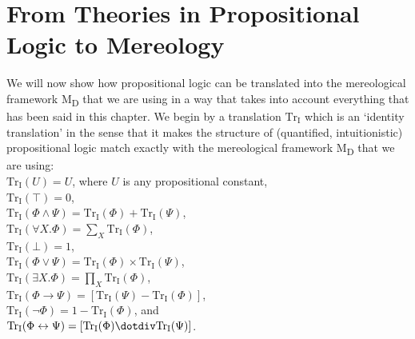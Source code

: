 \documentclass[12pt]{book}
\begin{document}
\section{From Theories in Propositional Logic to Mereology} \label{translation_from_propositional_logic}
We will now show how propositional logic can be translated into the mereological framework M\textsubscript{D} that we are using in a way that takes into account everything that has been said in this chapter. We begin by a translation $\mathrm{Tr_I}$ which is an `identity translation' in the sense that it makes the structure of (quantified, intuitionistic) propositional logic match exactly with the mereological framework M\textsubscript{D} that we are using:\\
\indent $\mathrm{Tr_I}(U) = U$, where $U$ is any propositional constant,\\
\indent $\mathrm{Tr_I}(\top) = 0$,\\
\indent $\mathrm{Tr_I}(\Phi \wedge \Psi) = \mathrm{Tr_I}(\Phi) + \mathrm{Tr_I}(\Psi)$,\\
\indent $\mathrm{Tr_I}(\forall X.\Phi) = \sum_{X}^{}{\mathrm{Tr_I}(\Phi)}$,\\
\indent $\mathrm{Tr_I}(\bot) = 1$,\\
\indent $\mathrm{Tr_I}(\Phi \vee \Psi) = \mathrm{Tr_I}(\Phi) \times \mathrm{Tr_I}(\Psi)$,\\
\indent $\mathrm{Tr_I}(\exists X.\Phi) = \prod_{X}^{}{\mathrm{Tr_I}(\Phi)}$,\\
\indent $\mathrm{Tr_I}(\Phi \rightarrow \Psi) = [\mathrm{Tr_I}(\Psi) - \mathrm{Tr_I}(\Phi)]$,\\
\indent $\mathrm{Tr_I}(\neg \Phi) = 1 - \mathrm{Tr_I}(\Phi)$, and\\
\indent $\mathrm{Tr_I}(\Phi \leftrightarrow \Psi) = [\mathrm{Tr_I}(\Phi) \dotdiv \mathrm{Tr_I}(\Psi)]$.
\end{document}
